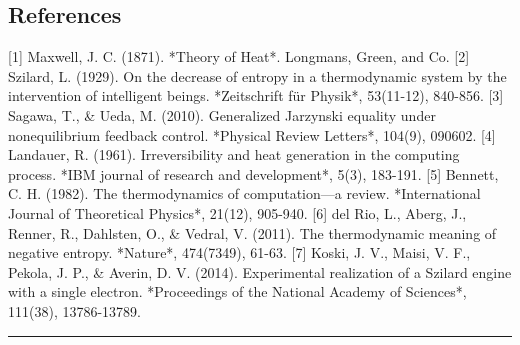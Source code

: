\documentclass[a4paper,11pt]{article}
\begin{document}
\subsection*{References}
[1] Maxwell, J. C. (1871). *Theory of Heat*. Longmans, Green, and Co.
[2] Szilard, L. (1929). On the decrease of entropy in a thermodynamic system by the intervention of intelligent beings. *Zeitschrift für Physik*, 53(11-12), 840-856.
[3] Sagawa, T., \& Ueda, M. (2010). Generalized Jarzynski equality under nonequilibrium feedback control. *Physical Review Letters*, 104(9), 090602.
[4] Landauer, R. (1961). Irreversibility and heat generation in the computing process. *IBM journal of research and development*, 5(3), 183-191.
[5] Bennett, C. H. (1982). The thermodynamics of computation—a review. *International Journal of Theoretical Physics*, 21(12), 905-940.
[6] del Rio, L., Aberg, J., Renner, R., Dahlsten, O., \& Vedral, V. (2011). The thermodynamic meaning of negative entropy. *Nature*, 474(7349), 61-63.
[7] Koski, J. V., Maisi, V. F., Pekola, J. P., \& Averin, D. V. (2014). Experimental realization of a Szilard engine with a single electron. *Proceedings of the National Academy of Sciences*, 111(38), 13786-13789.

\vspace{1em}\hrule\vspace{1em}
\end{document}
